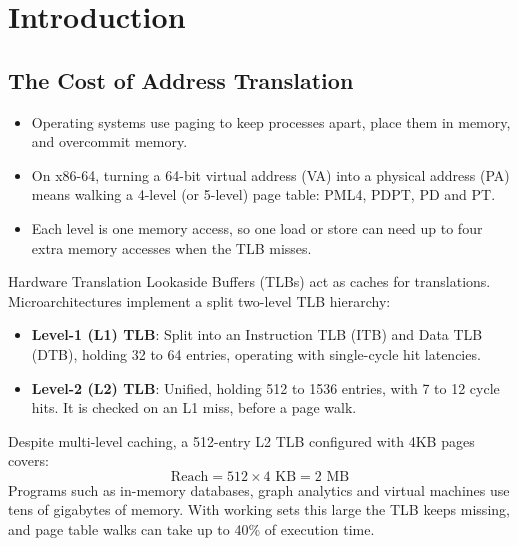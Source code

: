 
\section{Introduction}

\subsection{The Cost of Address Translation}
\begin{itemize}
    \item Operating systems use paging to keep processes apart, place them in memory, and overcommit memory.
    \item On x86-64, turning a 64-bit virtual address (VA) into a physical address (PA) means walking a 4-level (or 5-level) page table: PML4, PDPT, PD and PT.
    \item Each level is one memory access, so one load or store can need up to four extra memory accesses when the TLB misses.
\end{itemize}

Hardware Translation Lookaside Buffers (TLBs) act as caches for translations. Microarchitectures implement a split two-level TLB hierarchy:
\begin{itemize}
    \item \textbf{Level-1 (L1) TLB}: Split into an Instruction TLB (ITB) and Data TLB (DTB), holding 32 to 64 entries, operating with single-cycle hit latencies.
    \item \textbf{Level-2 (L2) TLB}: Unified, holding 512 to 1536 entries, with 7 to 12 cycle hits. It is checked on an L1 miss, before a page walk.
\end{itemize}

Despite multi-level caching, a 512-entry L2 TLB configured with 4KB pages covers:
\begin{equation}
    \text{Reach} = 512 \times 4\text{ KB} = 2\text{ MB}
\end{equation}
Programs such as in-memory databases, graph analytics and virtual machines use tens of gigabytes of memory. With working sets this large the TLB keeps missing, and page table walks can take up to 40\% of execution time.

